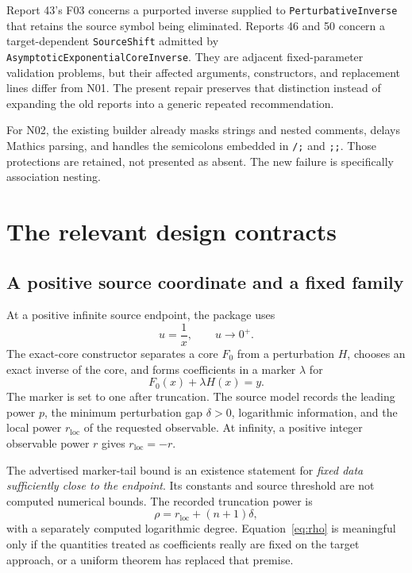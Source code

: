 \documentclass[11pt,letterpaper]{article}
\newcommand{\code}[1]{\nolinkurl{#1}}
\begin{document}
Report 43's F03 concerns a purported inverse supplied to \code{PerturbativeInverse} that retains the source symbol being eliminated. Reports 46 and 50 concern a target-dependent \code{SourceShift} admitted by \code{AsymptoticExponentialCoreInverse}. They are adjacent fixed-parameter validation problems, but their affected arguments, constructors, and replacement lines differ from N01. The present repair preserves that distinction instead of expanding the old reports into a generic repeated recommendation.\cite{report43,report46,wave6}

For N02, the existing builder already masks strings and nested comments, delays Mathics parsing, and handles the semicolons embedded in \code{/;} and \code{;;}. Those protections are retained, not presented as absent. The new failure is specifically association nesting.\cite{builder,buildertests}

\section{The relevant design contracts}

\subsection{A positive source coordinate and a fixed family}
At a positive infinite source endpoint, the package uses
\[
 u=\frac1x,\qquad u\longrightarrow0^+.
\]
The exact-core constructor separates a core \(F_0\) from a perturbation \(H\), chooses an exact inverse of the core, and forms coefficients in a marker \(\lambda\) for
\begin{equation}
 F_0(x)+\lambda H(x)=y.
 \label{eq:marker}
\end{equation}
The marker is set to one after truncation. The source model records the leading power \(p\), the minimum perturbation gap \(\delta>0\), logarithmic information, and the local power \(r_{\mathrm{loc}}\) of the requested observable. At infinity, a positive integer observable power \(r\) gives \(r_{\mathrm{loc}}=-r\).\cite{core}

The advertised marker-tail bound is an existence statement for \emph{fixed data sufficiently close to the endpoint}. Its constants and source threshold are not computed numerical bounds. The recorded truncation power is
\begin{equation}
 \rho=r_{\mathrm{loc}}+(n+1)\delta,
 \label{eq:rho}
\end{equation}
with a separately computed logarithmic degree. Equation~\eqref{eq:rho} is meaningful only if the quantities treated as coefficients really are fixed on the target approach, or a uniform theorem has replaced that premise.\cite{core}
\end{document}
